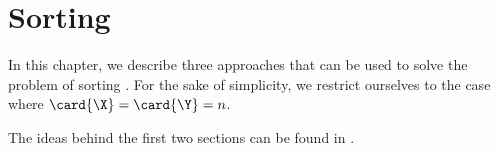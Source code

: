 \chapter{Sorting \XY}

In this chapter, we describe three approaches that can be used to solve the problem
of sorting \XY. For the sake of simplicity,
we restrict ourselves to the case where $\card{\X} = \card{\Y} = n$.

The ideas behind the first two sections can be found in \citet*{harper:1975}.
